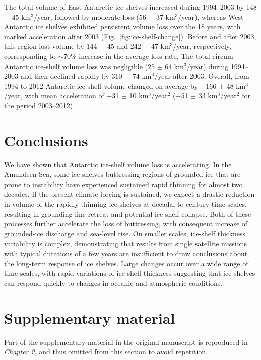 The total volume of East Antarctic ice shelves
increased during 1994--2003 by 148 $\pm$ 45 km$^3$/year,
followed by moderate loss (56 $\pm$ 37 km$^3$/year),
whereas West Antarctic ice shelves exhibited
persistent volume loss over the 18 years, with
marked acceleration after 2003 (Fig.~\ref{fig:ice-shelf-change}). Before
and after 2003, this region lost volume by 144 $\pm$ 45 and 
242 $\pm$ 47 km$^3$/year, respectively, corresponding
to $\sim$70\% increase in the average loss
rate. The total circum-Antarctic ice-shelf volume
loss was negligible (25 $\pm$ 64 km$^3$/year) during
1994--2003 and then declined rapidly by 
310 $\pm$ 74 km$^3$/year after 2003. Overall, from 1994 to
2012 Antarctic ice-shelf volume changed on average
by $-$166 $\pm$ 48 km$^3$/year, with mean acceleration
of $-$31 $\pm$ 10 km$^3$/year$^2$ ($-$51 $\pm$ 33 km$^3$/year$^2$ for the
period 2003--2012).

\section{Conclusions}

We have shown that Antarctic ice-shelf volume
loss is accelerating. In the Amundsen Sea,
some ice shelves buttressing regions of grounded
ice that are prone to instability have experienced
sustained rapid thinning for almost two decades.
If the present climate forcing is sustained, we
expect a drastic reduction in volume of the rapidly
thinning ice shelves at decadal to century
time scales, resulting in grounding-line retreat
and potential ice-shelf collapse. Both of these processes
further accelerate the loss of buttressing,
with consequent increase of grounded-ice
discharge and sea-level rise. On smaller scales,
ice-shelf thickness variability is complex, demonstrating
that results from single satellite missions
with typical durations of a few years are
insufficient to draw conclusions about the long-term
response of ice shelves. Large changes occur
over a wide range of time scales, with rapid variations
of ice-shelf thickness suggesting that ice
shelves can respond quickly to changes in oceanic
and atmospheric conditions.


\section{Supplementary material}

Part of the supplementary material in the original manuscript is reproduced in {\sl Chapter 2}, and thus omitted from this section to avoid repetition.

